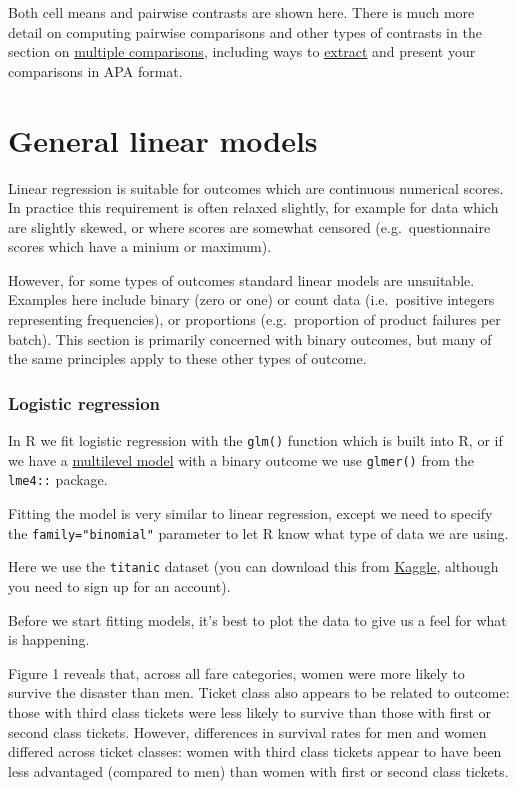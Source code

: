 \documentclass[]{article}
\theoremstyle{definition}
\theoremstyle{definition}
\theoremstyle{definition}
\theoremstyle{remark}
\begin{document}
Both cell means and pairwise contrasts are shown here. There is much
more detail on computing pairwise comparisons and other types of
contrasts in the section on
\protect\hyperlink{multiple-comparisons}{multiple comparisons},
including ways to \protect\hyperlink{extract-contrasts}{extract} and
present your comparisons in APA format.

\section{General linear models}\label{general-linear-models}

Linear regression is suitable for outcomes which are continuous
numerical scores. In practice this requirement is often relaxed
slightly, for example for data which are slightly skewed, or where
scores are somewhat censored (e.g.~questionnaire scores which have a
minium or maximum).

However, for some types of outcomes standard linear models are
unsuitable. Examples here include binary (zero or one) or count data
(i.e.~positive integers representing frequencies), or proportions
(e.g.~proportion of product failures per batch). This section is
primarily concerned with binary outcomes, but many of the same
principles apply to these other types of outcome.

\hypertarget{logistic-regression}{\subsubsection*{Logistic
regression}\label{logistic-regression}}

In R we fit logistic regression with the \texttt{glm()} function which
is built into R, or if we have a
\protect\hyperlink{multilevel-models}{multilevel model} with a binary
outcome we use \texttt{glmer()} from the \texttt{lme4::} package.

Fitting the model is very similar to linear regression, except we need
to specify the \texttt{family="binomial"} parameter to let R know what
type of data we are using.

Here we use the \texttt{titanic} dataset (you can download this from
\href{https://www.kaggle.com/c/titanic/data}{Kaggle}, although you need
to sign up for an account).

Before we start fitting models, it's best to plot the data to give us a
feel for what is happening.

{Figure 1 reveals that, across all fare categories, women were more
likely to survive the disaster than men. Ticket class also appears to be
related to outcome: those with third class tickets were less likely to
survive than those with first or second class tickets. However,
differences in survival rates for men and women differed across ticket
classes: women with third class tickets appear to have been less
advantaged (compared to men) than women with first or second class
tickets.}
\end{document}
